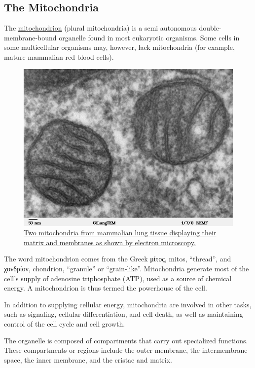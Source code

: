 \hypertarget{the-mitochondria}{%
\subsection{The Mitochondria}\label{the-mitochondria}}

The \href{https://en.wikipedia.org/wiki/Mitochondrion}{mitochondrion} (plural mitochondria) is a semi autonomous double-membrane-bound organelle found in most eukaryotic organisms. Some cells in some multicellular organisms may, however, lack mitochondria (for example, mature mammalian red blood cells).



\begin{figure}

{\centering \includegraphics[width=0.7\linewidth]{./figures/cells/Mitochondria_mammalian_lung_TEM} 

}

\caption{\href{https://commons.wikimedia.org/wiki/File:Mitochondria,_mammalian_lung_-_TEM.jpg}{Two mitochondria from mammalian lung tissue displaying their matrix and membranes as shown by electron microscopy.}}\label{fig:electromitochondrion}
\end{figure}

The word mitochondrion comes from the Greek μίτος, mitos, ``thread'', and χονδρίον, chondrion, ``granule'' or ``grain-like''. Mitochondria generate most of the cell's supply of adenosine triphosphate (ATP), used as a source of chemical energy. A mitochondrion is thus termed the powerhouse of the cell.

In addition to supplying cellular energy, mitochondria are involved in other tasks, such as signaling, cellular differentiation, and cell death, as well as maintaining control of the cell cycle and cell growth.

The organelle is composed of compartments that carry out specialized functions. These compartments or regions include the outer membrane, the intermembrane space, the inner membrane, and the cristae and matrix.



